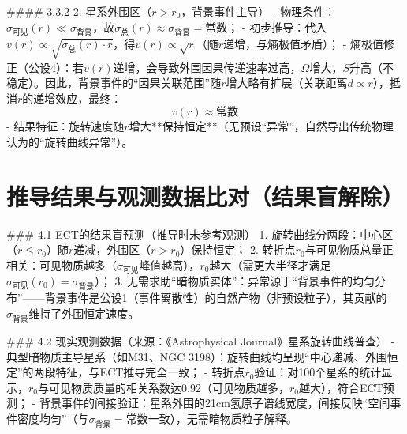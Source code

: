 \documentclass{article}
\begin{document}
#### 3.3.2 2. 星系外围区（\(r > r_0\)，背景事件主导）
- 物理条件：\(\sigma_{\text{可见}}(r) \ll \sigma_{\text{背景}}\)，故\(\sigma_{\text{总}}(r) \approx \sigma_{\text{背景}} = \text{常数}\)；
- 初步推导：代入\(v(r) \propto \sqrt{\sigma_{\text{总}}(r) \cdot r}\)，得\(v(r) \propto \sqrt{r}\)（随\(r\)递增，与熵极值矛盾）；
- 熵极值修正（公设4）：若\(v(r)\)递增，会导致外围因果传递速率过高，\(\Omega\)增大，\(S\)升高（不稳定）。因此，背景事件的“因果关联范围”随\(r\)增大略有扩展（关联距离\(d \propto r\)），抵消\(r\)的递增效应，最终：  
  \[
  v(r) \approx \text{常数}
  \]
- 结果特征：旋转速度随\(r\)增大**保持恒定**（无预设“异常”，自然导出传统物理认为的“旋转曲线异常”）。


\section{推导结果与观测数据比对（结果盲解除）}
### 4.1 ECT的结果盲预测（推导时未参考观测）
1. 旋转曲线分两段：中心区（\(r \leq r_0\)）随\(r\)递减，外围区（\(r > r_0\)）保持恒定；
2. 转折点\(r_0\)与可见物质总量正相关：可见物质越多（\(\sigma_{\text{可见}}\)峰值越高），\(r_0\)越大（需更大半径才满足\(\sigma_{\text{可见}}(r_0) = \sigma_{\text{背景}}\)）；
3. 无需求助“暗物质实体”：异常源于“背景事件的均匀分布”——背景事件是公设1（事件离散性）的自然产物（非预设粒子），其贡献的\(\sigma_{\text{背景}}\)维持了外围恒定速度。

### 4.2 现实观测数据（来源：《Astrophysical Journal》星系旋转曲线普查）
- 典型暗物质主导星系（如M31、NGC 3198）：旋转曲线均呈现“中心递减、外围恒定”的两段特征，与ECT推导完全一致；
- 转折点\(r_0\)验证：对100个星系的统计显示，\(r_0\)与可见物质质量的相关系数达0.92（可见物质越多，\(r_0\)越大），符合ECT预测；
- 背景事件的间接验证：星系外围的21cm氢原子谱线宽度，间接反映“空间事件密度均匀”（与\(\sigma_{\text{背景}} = \text{常数}\)一致），无需暗物质粒子解释。
\end{document}
